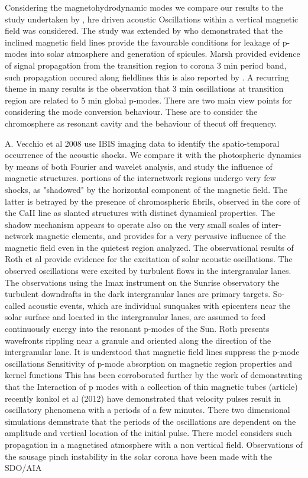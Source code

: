 \documentclass{aa}
\begin{document}
Considering the magnetohydrodynamic modes we compare our results to the study undertaken by  \cite{Hindman1996}, hre driven acoustic Oscillations within a vertical magnetic field  was considered. The study was extended by \cite{James2003} who demonstrated that the inclined magnetic field lines provide the favourable conditions for leakage of p-modes into solar atmosphere and generation of spicules. Marsh \cite{Marsh2006} provided evidence of signal propagation from the transition region to corona 3 min period band, such propagation occured along fieldlines this is also reported by \cite{Zhukov2002}. A recurring theme in many results is the observation that 3 min oscillations at transition region are related to 5 min global p-modes. There are two main view points for considering the mode conversion behaviour. These are to consider the chromosphere as resonant cavity and the behaviour of thecut off frequency.

A. Vecchio et al 2008  \cite{Cauzzi2008} use IBIS imaging data to 
identify the spatio-temporal occurrence of the acoustic shocks. We compare it with the photospheric dynamics by means of both Fourier and wavelet analysis, and study the influence of magnetic structures. portions of the internetwork regions undergo very few shocks, as "shadowed" by the horizontal component of the magnetic field. The latter is betrayed by the presence of chromospheric fibrils, observed in the core of the CaII line as slanted structures with distinct dynamical properties. The shadow mechanism appears to operate also on the very small scales of inter-network magnetic elements, and provides for a very pervasive influence of the magnetic field even in the quietest region analyzed. The observational results of Roth et al  \cite{Roth2010} provide evidence for the excitation of solar acoustic oscillations. The observed oscillations were excited by turbulent flows  in the intergranular lanes. The observations using the Imax instrument on the Sunrise observatory the turbulent downdrafts in the dark intergranular lanes are primary targets. So-called acoustic events, which are individual sunquakes with epicenters near the solar surface and located in the intergranular lanes, are assumed to feed continuously energy into the resonant p-modes of the Sun. Roth presents wavefronts rippling near a granule and oriented along the direction of the intergranular lane. It is understood that magnetic field lines suppress the p-mode oscillations \cite{Gascoyne2011} Sensitivity of p-mode absorption on magnetic region properties and kernel functions This has been corroborated further by the work of \cite{Jain2011} demonstrating that the Interaction of p modes with a collection of thin magnetic tubes (article) recently konkol et al (2012)  \cite{Konkol2012} have demonstrated that velocity pulses result in oscillatory phenomena with a periods of a few minutes. There two dimensional simulations demnstrate that the periods of the oscillations are dependent on the  amplitude and vertical location of the initial pulse. There model considers such propagation in a magnetised atmosphere with a non vertical field. Observations of the sausage pinch instability in the solar corona have been made with the SDO/AIA  \cite{Srivastava2013}
\end{document}
